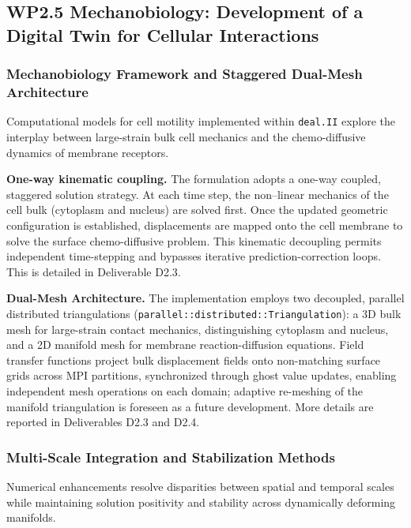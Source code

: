 \documentclass[a4paper,12pt, numbers]{article}
\newcommand{\dealii}{\texttt{deal.II}}
\begin{document}
\subsection{WP2.5 Mechanobiology: Development of a Digital Twin for Cellular Interactions}

\subsubsection*{Mechanobiology Framework and Staggered Dual-Mesh Architecture}

\noindent Computational models for cell motility implemented within \dealii{} explore the interplay between large-strain bulk cell mechanics and the chemo-diffusive dynamics of membrane receptors.

\noindent\textbf{One-way kinematic coupling.}
The formulation adopts a one-way coupled, staggered solution strategy. At each time step, the non--linear mechanics of the cell bulk (cytoplasm and nucleus) are solved first. Once the updated geometric configuration is established, displacements are mapped onto the cell membrane to solve the surface chemo-diffusive problem. This kinematic decoupling permits independent time-stepping and bypasses iterative prediction-correction loops. This is detailed in Deliverable D2.3.


\noindent\textbf{Dual-Mesh Architecture.}
The implementation employs two decoupled, parallel distributed triangulations (\texttt{parallel::distributed::Triangulation}): a 3D bulk mesh for large-strain contact mechanics, distinguishing cytoplasm and nucleus, and a 2D manifold mesh for membrane reaction-diffusion equations. Field transfer functions project bulk displacement fields onto non-matching surface grids across MPI partitions, synchronized through ghost value updates, enabling independent mesh operations on each domain; adaptive re-meshing of the manifold triangulation is foreseen as a future development. More details are reported in Deliverables D2.3 and D2.4.



\subsubsection*{Multi-Scale Integration and Stabilization Methods}

\noindent Numerical enhancements resolve disparities between spatial and temporal scales while maintaining solution positivity and stability across dynamically deforming manifolds.
\end{document}
